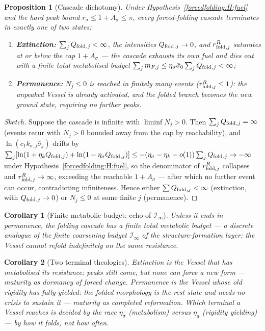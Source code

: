 \documentclass[11pt,a4paper,oneside]{book}
\newcommand{\Qf}{Q_{\rm fold}}
\newcommand{\rs}{r_\sigma}
\newcommand{\rRj}{r^{R}_{{\rm fold},j}}
\theoremstyle{plain}
\newtheorem{proposition}{Proposition}[chapter]
\newtheorem{corollary}{Corollary}[chapter]
\theoremstyle{definition}
\theoremstyle{remark}
\begin{document}
\begin{proposition}[Cascade dichotomy]\label{forcedfolding:prop:dichotomy}
Under Hypothesis~\ref{forcedfolding:H:fuel} and the hard peak bound $\rs\le1+A_\sigma\le\pi$, every forced-folding
cascade terminates in exactly one of two states:
\begin{enumerate}[label=(\roman*),leftmargin=1.8em,itemsep=2pt]
\item \textbf{Extinction:} $\sum_j\Qf{}_{,j}<\infty$, the intensities $\Qf{}_{,j}\to0$, and $\rRj$
saturates at or below the cap $1+A_\sigma$ --- the cascade exhausts its own fuel and dies out with a
finite total metabolised budget $\sum_jm_{F,j}\le\eta_\sigma\bar\sigma_0\sum_j\Qf{}_{,j}<\infty$;
\item \textbf{Permanence:} $N_j\le0$ is reached in finitely many events ($\rRj\le1$): the unpeaked
Vessel is already activated, and the folded branch becomes the new ground state, requiring no further
peaks.
\end{enumerate}
\end{proposition}
\begin{proof}[Sketch]
Suppose the cascade is infinite with $\liminf N_j>0$. Then $\sum_j\Qf{}_{,j}=\infty$ (events recur with
$N_j>0$ bounded away from the cap by reachability), and
$\ln(c_1k_{\sigma,j}\bar\sigma_j)$ drifts by $\sum_j[\ln(1+\eta_k\Qf{}_{,j})+\ln(1-\eta_\sigma\Qf{}_{,j})]
\le-(\eta_\sigma-\eta_k-o(1))\sum_j\Qf{}_{,j}\to-\infty$ under Hypothesis~\ref{forcedfolding:H:fuel}, so the
denominator of $\rRj$ collapses and $\rRj\to\infty$, exceeding the reachable $1+A_\sigma$ --- after
which no further event can occur, contradicting infiniteness. Hence either $\sum\Qf{}_{,j}<\infty$
(extinction, with $\Qf{}_{,j}\to0$) or $N_j\le0$ at some finite $j$ (permanence).
\end{proof}

\begin{corollary}[Finite metabolic budget; echo of $\mathcal I_\infty$]
Unless it ends in permanence, the folding cascade has a finite total metabolic budget --- a discrete
analogue of the finite coarsening budget $\mathcal I_\infty$ of the structure-formation layer: the
Vessel cannot refold indefinitely on the same resistance.
\end{corollary}

\begin{corollary}[Two terminal theologies]
Extinction is the Vessel that has metabolised its resistance: peaks still come, but none can force a new
form --- maturity as dormancy of forced change. Permanence is the Vessel whose old rigidity has fully
yielded: the folded morphology is the rest state and needs no crisis to sustain it --- maturity as
completed reformation. Which terminal a Vessel reaches is decided by the race
$\eta_\sigma$ (metabolism) versus $\eta_a$ (rigidity yielding) --- by \emph{how} it folds, not how often.
\end{corollary}
\end{document}
